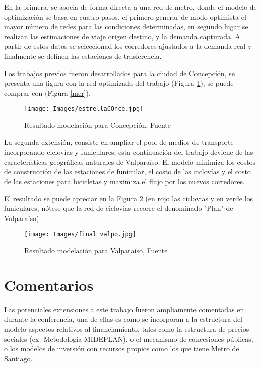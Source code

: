 \documentclass{article}
\begin{document}
En la primera, se asocia de forma directa a una red de metro, donde 
el modelo de optimización se basa en cuatro pasos, el primero generar de modo optimista el mayor número de redes para las condiciones determinadas, en segundo lugar se realizan las estimaciones de viaje origen destino, y la demanda capturada. A partir de estos datos se seleccionad los corredores ajustados a la demanda real y finalmente se definen las estaciones de trasferencia.

Los trabajos previos fueron desarrollados para la ciudad de Concepción, se presenta una figura con la red optimizada del trabajo (Figura \ref{conce}), se puede comprar con (Figura \ref{mer}).

\begin{figure}[H]
\texttt{[image: Images/estrellaCOnce.jpg]}
\centering
\caption{Resultado modelación para Concepción, Fuente \cite{article1}}
\label{conce}
\end{figure}

La segunda extensión, consiste en ampliar el pool de medios de transporte incorporando ciclovías y funiculares, esta continuación del trabajo deviene de las características geográficas naturales de Valparaíso. El modelo minimiza los costos de construcción de las estaciones de funicular, el costo de las ciclovías y el costo de las estaciones para bicicletas y maximiza el flujo por los nuevos corredores.

El resultado se puede apreciar en la Figura \ref{valpo} (en rojo las ciclovias y en verde los funiculares, nótese que la red de ciclovias recorre el denominado "Plan" de Valparaíso)

\begin{figure}[H]
\texttt{[image: Images/final valpo.jpg]}
\centering
\caption{Resultado modelación para Valparaíso, Fuente \cite{article2}}
\label{valpo}
\end{figure}

\section{Comentarios}

Las potenciales extensiones a este trabajo fueron ampliamente comentadas en durante la conferencia, una de ellas es como se incorporan a la estructura del modelo aspectos relativos al financiamiento, tales como la estructura de precios sociales (ex- Metodología MIDEPLAN), o el mecanismo de concesiones públicas, o los modelos de inversión con recursos propios como los que tiene Metro de Santiago.
\end{document}
